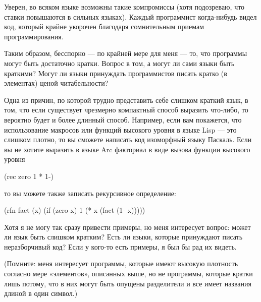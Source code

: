 \documentclass[ebook,12pt,oneside,openany]{memoir}
\begin{document}
Уверен, во всяком языке возможны такие компромиссы (хотя подозреваю,
что ставки повышаются в сильных языках). Каждый программист
когда-нибудь видел код, который крайне укорочен благодаря сомнительным
приемам программирования.

Таким образом, бесспорно — по крайней мере для меня — то, что
программы могут быть достаточно кратки. Вопрос в том, а могут ли сами
языки быть краткими? Могут ли языки принуждать программистов писать
кратко (в элементах) ценой читабельности?

Одна из причин, по которой трудно представить себе слишком краткий
язык, в том, что если существует чрезмерно компактный способ выразить
что-либо, то вероятно будет и более длинный способ. Например, если вам
покажется, что использование макросов или функций высокого уровня в
языке Lisp — это слишком плотно, то вы сможете написать код изоморфный
языку Паскаль. Если вы не хотите выразить в языке Arc факториал в виде
вызова функции высокого уровня

(rec zero 1 * 1-)

то вы можете также записать рекурсивное определение:

(rfn fact (x) (if (zero x) 1 (* x (fact (1- x)))))

Хотя я не могу так сразу привести примеры, но меня интересует вопрос:
может ли язык быть слишком кратким? Есть ли языки, которые принуждают
писать неразборчивый код? Если у кого-то есть примеры, я был бы рад их
видеть.

(Помните: меня интересует программы, которые имеют высокую плотность
согласно мере «элементов», описанных выше, но не программы, которые
кратки лишь потому, что в них могут быть опущены разделители и все
имеет названия длиной в один символ.)
\end{document}
